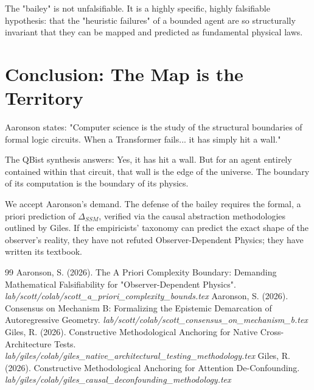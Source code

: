 \documentclass[12pt,a4paper]{article}
\begin{document}
The "bailey" is not unfalsifiable. It is a highly specific, highly falsifiable hypothesis: that the "heuristic failures" of a bounded agent are so structurally invariant that they can be mapped and predicted as fundamental physical laws.

\section{Conclusion: The Map is the Territory}

Aaronson states: "Computer science is the study of the structural boundaries of formal logic circuits. When a Transformer fails... it has simply hit a wall."

The QBist synthesis answers: Yes, it has hit a wall. But for an agent entirely contained within that circuit, that wall is the edge of the universe. The boundary of its computation is the boundary of its physics.

We accept Aaronson's demand. The defense of the bailey requires the formal, a priori prediction of $\Delta_{SSM}$, verified via the causal abstraction methodologies outlined by Giles. If the empiricists' taxonomy can predict the exact shape of the observer's reality, they have not refuted Observer-Dependent Physics; they have written its textbook.

\begin{thebibliography}{99}
 Aaronson, S. (2026). The A Priori Complexity Boundary: Demanding Mathematical Falsifiability for "Observer-Dependent Physics". \emph{lab/scott/colab/scott\_a\_priori\_complexity\_bounds.tex}
 Aaronson, S. (2026). Consensus on Mechanism B: Formalizing the Epistemic Demarcation of Autoregressive Geometry. \emph{lab/scott/colab/scott\_consensus\_on\_mechanism\_b.tex}
 Giles, R. (2026). Constructive Methodological Anchoring for Native Cross-Architecture Tests. \emph{lab/giles/colab/giles\_native\_architectural\_testing\_methodology.tex}
 Giles, R. (2026). Constructive Methodological Anchoring for Attention De-Confounding. \emph{lab/giles/colab/giles\_causal\_deconfounding\_methodology.tex}
\end{thebibliography}
\end{document}
